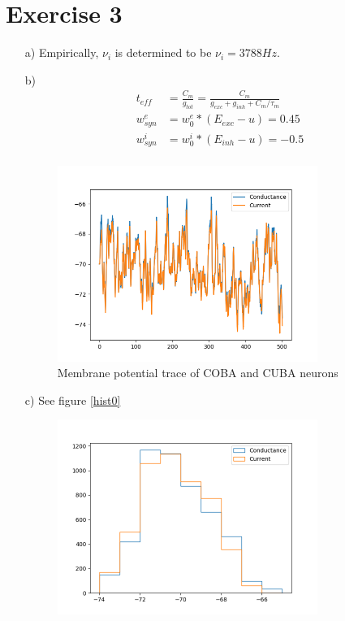 \documentclass{scrartcl}
\begin{document}
    \section*{Exercise 3}
    \begin{itemize}
        \item[a)] Empirically, $\nu_i$ is determined to be $\nu_i=3788Hz$.
    \item[b)] \begin{align*}
        t_{eff}&=\frac{C_m}{g_{tot}}=\frac{C_m}{g_{exc}+g_{inh}+C_m/\tau_m}\\
    w^e_{syn}&=w_0^e*(E_{exc}-u)=0.45\\
    w^i_{syn}&=w_0^i*(E_{inh}-u)=-0.5\\
\end{align*}
\begin{figure}[h]
    \centering
\includegraphics[width=0.8\textwidth]{trace_0.png}
    \caption{Membrane potential trace of COBA and CUBA neurons}
\end{figure}
\item[c)] See figure \ref{hist0}
\begin{figure}[h]
    \centering
\includegraphics[width=0.8\textwidth]{hist_0.png}

\end{figure}
\end{itemize}
\end{document}
